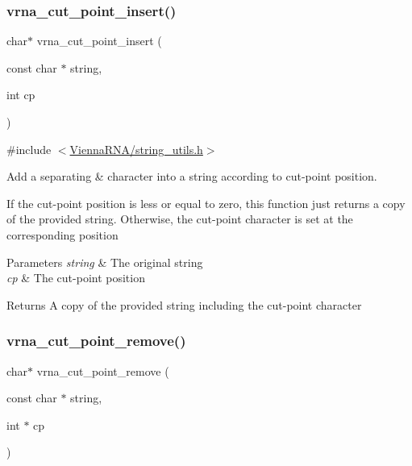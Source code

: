 \subsubsection{\texorpdfstring{vrna\+\_\+cut\+\_\+point\+\_\+insert()}{vrna\_cut\_point\_insert()}}
{\footnotesize\ttfamily char$\ast$ vrna\+\_\+cut\+\_\+point\+\_\+insert (\begin{DoxyParamCaption}\item[{const char $\ast$}]{string,  }\item[{int}]{cp }\end{DoxyParamCaption})}



{\ttfamily \#include $<$\hyperlink{string__utils_8h}{Vienna\+R\+N\+A/string\+\_\+utils.\+h}$>$}



Add a separating \textquotesingle{}\&\textquotesingle{} character into a string according to cut-\/point position. 

If the cut-\/point position is less or equal to zero, this function just returns a copy of the provided string. Otherwise, the cut-\/point character is set at the corresponding position


\begin{DoxyParams}{Parameters}
{\em string} & The original string \\
\hline
{\em cp} & The cut-\/point position \\
\hline
\end{DoxyParams}
\begin{DoxyReturn}{Returns}
A copy of the provided string including the cut-\/point character 
\end{DoxyReturn}
\mbox{\label{group__string__utils_ga1fbd821d4408cc5f1dd9d12c15e092cb}} 
\subsubsection{\texorpdfstring{vrna\+\_\+cut\+\_\+point\+\_\+remove()}{vrna\_cut\_point\_remove()}}
{\footnotesize\ttfamily char$\ast$ vrna\+\_\+cut\+\_\+point\+\_\+remove (\begin{DoxyParamCaption}\item[{const char $\ast$}]{string,  }\item[{int $\ast$}]{cp }\end{DoxyParamCaption})}



